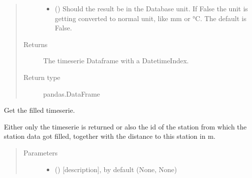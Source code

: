 \documentclass[letterpaper,10pt,english]{sphinxmanual}
\begin{document}
\begin{fulllineitems}
\begin{fulllineitems}
\begin{quote}
\begin{description}
\begin{itemize}
\item {} 
\sphinxAtStartPar
{} (\sphinxstyleliteralemphasis{\sphinxupquote{, }}) \textendash{} Should the result be in the Database unit.
If False the unit is getting converted to normal unit, like mm or °C.
The default is False.

\end{itemize}

\item[{Returns}] \leavevmode
\sphinxAtStartPar
The timeserie Dataframe with a DatetimeIndex.

\item[{Return type}] \leavevmode
\sphinxAtStartPar
pandas.DataFrame

\end{description}\end{quote}

\end{fulllineitems}


\begin{fulllineitems}
\label{\detokenize{weatherDB:weatherDB.station.StationBase.get_dist}}
\end{fulllineitems}


\begin{fulllineitems}
\label{\detokenize{weatherDB:weatherDB.station.StationBase.get_filled}}
\sphinxAtStartPar
Get the filled timeserie.

\sphinxAtStartPar
Either only the timeserie is returned or also the id of the station from which the station data got filled, together with the distance to this station in m.
\begin{quote}\begin{description}
\item[{Parameters}] \leavevmode\begin{itemize}
\item {} 
\sphinxAtStartPar
{} (\sphinxstyleliteralemphasis{\sphinxupquote{, }}) \textendash{} {[}description{]}, by default (None, None)


\end{itemize}
\end{description}
\end{quote}
\end{fulllineitems}
\end{fulllineitems}
\end{document}
